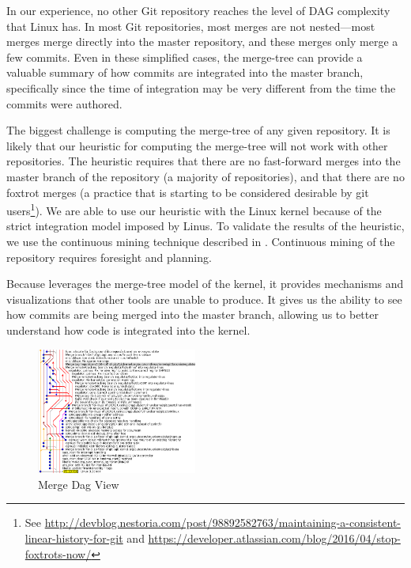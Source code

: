\documentclass[draft]{IEEEtran}
\begin{document}
In our experience, no other Git repository reaches the level of DAG
complexity that Linux has. In most Git repositories, most merges are not
nested---most merges merge directly into the master repository, and
these merges only merge a few commits. Even in these simplified cases,
the merge-tree can provide a valuable summary of how commits are
integrated into the master branch, specifically since the time of
integration may be very different from the time the commits were
authored.


The biggest challenge is computing the merge-tree of any given
repository. It is likely that our heuristic for computing the merge-tree
will not work with other repositories. The heuristic requires that there
are no fast-forward merges into the master branch of the repository (a
majority of repositories), and that there are no foxtrot merges (a
practice that is starting to be considered desirable by git
users\footnote{See
  \url{http://devblog.nestoria.com/post/98892582763/maintaining-a-consistent-linear-history-for-git}
  and
  \url{https://developer.atlassian.com/blog/2016/04/stop-foxtrots-now/}}).
We are able to use our heuristic with the Linux kernel because of the
strict integration model imposed by Linus. To validate the results of
the heuristic, we use the continuous mining technique described in
\cite{German2015}.  Continuous mining of the repository requires
foresight and planning.

Because \tool leverages the merge-tree model of the kernel, it provides
mechanisms and visualizations that other tools are unable to produce. It
gives us the ability to see how commits are being merged into the master
branch, allowing us to better understand how code is integrated into the
kernel.

\begin{figure}
        \centering
        \includegraphics[width=0.47\textwidth]{figures/042dd_DAG.png}
        \caption{Merge Dag View}
        \label{fig:dag_view}
\end{figure}
\end{document}
